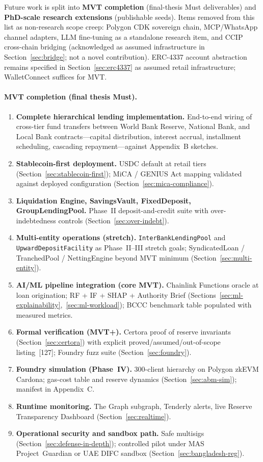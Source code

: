 \documentclass[12pt,a4paper]{report}
\begin{document}
Future work is split into \textbf{MVT completion} (final-thesis Must deliverables) and \textbf{PhD-scale research extensions} (publishable seeds). Items removed from this list as non-research scope creep: Polygon CDK sovereign chain, MCP/WhatsApp channel adapters, LLM fine-tuning as a standalone research item, and CCIP cross-chain bridging (acknowledged as assumed infrastructure in Section~\ref{sec:bridge}; not a novel contribution). ERC-4337 account abstraction remains specified in Section~\ref{sec:erc4337} as assumed retail infrastructure; WalletConnect suffices for MVT.
\label{sec:future-work}

\paragraph{MVT completion (final thesis Must).}
\begin{enumerate}[noitemsep]
\item \textbf{Complete hierarchical lending implementation.} End-to-end wiring of cross-tier fund transfers between World Bank Reserve, National Bank, and Local Bank contracts---capital distribution, interest accrual, installment scheduling, cascading repayment---against Appendix~B sketches.
\item \textbf{Stablecoin-first deployment.} USDC default at retail tiers (Section~\ref{sec:stablecoin-first}); MiCA / GENIUS Act mapping validated against deployed configuration (Section~\ref{sec:mica-compliance}).
\item \textbf{Liquidation Engine, SavingsVault, FixedDeposit, GroupLendingPool.} Phase~II deposit-and-credit suite with over-indebtedness controls (Section~\ref{sec:over-indebt}).
\item \textbf{Multi-entity operations (stretch).} \texttt{InterBankLendingPool} and \texttt{UpwardDepositFacility} as Phase~II--III stretch goals; SyndicatedLoan / TranchedPool / NettingEngine beyond MVT minimum (Section~\ref{sec:multi-entity}).
\item \textbf{AI/ML pipeline integration (core MVT).} Chainlink Functions oracle at loan origination; RF + IF + SHAP + Authority Brief (Sections~\ref{sec:ml-explainability},~\ref{sec:ml-workload}); BCCC benchmark table populated with measured metrics.
\item \textbf{Formal verification (MVT+).} Certora proof of reserve invariants (Section~\ref{sec:certora}) with explicit proved/assumed/out-of-scope listing~[127]; Foundry fuzz suite (Section~\ref{sec:foundry}).
\item \textbf{Foundry simulation (Phase~IV).} 300-client hierarchy on Polygon zkEVM Cardona; gas-cost table and reserve dynamics (Section~\ref{sec:abm-sim}); manifest in Appendix~C.
\item \textbf{Runtime monitoring.} The Graph subgraph, Tenderly alerts, live Reserve Transparency Dashboard (Section~\ref{sec:realtime}).
\item \textbf{Operational security and sandbox path.} Safe multisigs (Section~\ref{sec:defense-in-depth}); controlled pilot under MAS Project~Guardian or UAE DIFC sandbox (Section~\ref{sec:bangladesh-reg}).
\end{enumerate}
\end{document}
